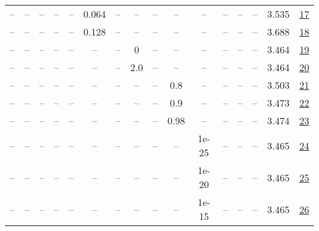 \begin{table}[H]
\begin{tabular}{cccccccccccccccc}
-- & -- & -- & -- & -- & 0.064 & -- & -- & -- & -- & -- & -- & -- & -- & 3.535 & \href{https://wandb.ai/stanford-mercury/optimizer-scaling/runs/sweep-130m-2B-muon6a313elr0.064-wd0.1-minlr0-warmup0-b10.8-b20.9-6c90c8}{17} \\
-- & -- & -- & -- & -- & 0.128 & -- & -- & -- & -- & -- & -- & -- & -- & 3.688 & \href{https://wandb.ai/stanford-mercury/optimizer-scaling/runs/sweep-130m-2B-muonfd5e36lr0.128-wd0.1-minlr0-warmup0-b10.8-b20.9-e1053e}{18} \\
-- & -- & -- & -- & -- & -- & -- & 0 & -- & -- & -- & -- & -- & -- & 3.464 & \href{https://wandb.ai/stanford-mercury/optimizer-scaling/runs/sweep-130m-2B-muon27ade5lr0.016-wd0.1-minlr0-warmup0-b10.8-b20.9-e1e972}{19} \\
-- & -- & -- & -- & -- & -- & -- & 2.0 & -- & -- & -- & -- & -- & -- & 3.464 & \href{https://wandb.ai/stanford-mercury/optimizer-scaling/runs/sweep-130m-2B-muon32f61blr0.016-wd0.1-minlr0-warmup0-b10.8-b20.9-c15abf}{20} \\
-- & -- & -- & -- & -- & -- & -- & -- & -- & 0.8 & -- & -- & -- & -- & 3.503 & \href{https://wandb.ai/stanford-mercury/optimizer-scaling/runs/sweep-130m-2B-muon45cb63lr0.016-wd0.1-minlr0-warmup0-b10.8-b20.9-9acb9b}{21} \\
-- & -- & -- & -- & -- & -- & -- & -- & -- & 0.9 & -- & -- & -- & -- & 3.473 & \href{https://wandb.ai/stanford-mercury/optimizer-scaling/runs/sweep-130m-2B-muon87b72elr0.016-wd0.1-minlr0-warmup0-b10.8-b20.9-8a4d9a}{22} \\
-- & -- & -- & -- & -- & -- & -- & -- & -- & 0.98 & -- & -- & -- & -- & 3.474 & \href{https://wandb.ai/stanford-mercury/optimizer-scaling/runs/sweep-130m-2B-muon076dd0lr0.016-wd0.1-minlr0-warmup0-b10.8-b20.9-07654a}{23} \\
-- & -- & -- & -- & -- & -- & -- & -- & -- & -- & 1e-25 & -- & -- & -- & 3.465 & \href{https://wandb.ai/stanford-mercury/optimizer-scaling/runs/sweep-130m-2B-muon978ba9lr0.016-wd0.1-minlr0-warmup0-b10.8-b20.9-d1c853}{24} \\
-- & -- & -- & -- & -- & -- & -- & -- & -- & -- & 1e-20 & -- & -- & -- & 3.465 & \href{https://wandb.ai/stanford-mercury/optimizer-scaling/runs/sweep-130m-2B-muona3753elr0.016-wd0.1-minlr0-warmup0-b10.8-b20.9-2408aa}{25} \\
-- & -- & -- & -- & -- & -- & -- & -- & -- & -- & 1e-15 & -- & -- & -- & 3.465 & \href{https://wandb.ai/stanford-mercury/optimizer-scaling/runs/sweep-130m-2B-muonbe2964lr0.016-wd0.1-minlr0-warmup0-b10.8-b20.9-764b29}{26} \\

\end{tabular}
\end{table}
